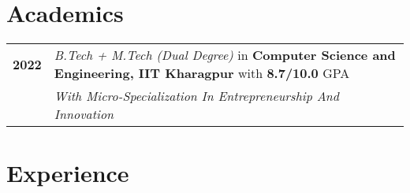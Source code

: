 \documentclass[a4paper,10pt]{extarticle} %
\begin{document}
\vspace{-0.4cm}
\section{\textcolor{primary}{Academics}}

\begin{tabular}{r|p{17.5cm}}
  \textbf{2022} & \textit{B.Tech + M.Tech (Dual Degree)} in \textbf{Computer Science and Engineering, IIT Kharagpur } with \textbf{8.7/10.0} GPA \\
  \hfill        & \textit{With Micro-Specialization In Entrepreneurship And Innovation}                                                          \\
\end{tabular}

\vspace{-0.1cm}
\section{\textcolor{primary}{Experience}}
\end{document}
